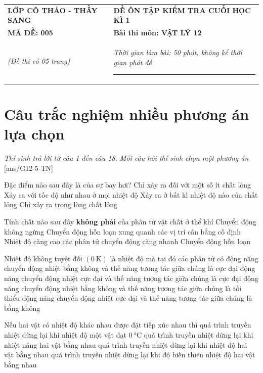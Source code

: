 \begin{tabular}{M{6.5cm}M{11cm}}
	\textbf{LỚP CÔ THẢO - THẦY SANG}& \textbf{ĐỀ ÔN TẬP KIỂM TRA CUỐI HỌC KÌ 1}\\
	\textbf{MÃ ĐỀ: 005}& \textbf{Bài thi môn: VẬT LÝ 12}\\
	\textit{(Đề thi có 05 trang)}& \textit{Thời gian làm bài: 50 phút, không kể thời gian phát đề}
	
	\noindent\rule{4cm}{0.8pt} \\
\end{tabular}
\setcounter{section}{0}
\section{Câu trắc nghiệm nhiều phương án lựa chọn}
\textit{Thí sinh trả lời từ câu 1 đến câu 18. Mỗi câu hỏi thí sinh chọn một phương án}
\setcounter{ex}{0}
[ans/G12-5-TN]
\begin{ex}
Đặc điểm nào sau đây là của sự bay hơi?	
	\choice
	{Chỉ xảy ra đối với một số ít chất lỏng}
	{Xảy ra với tốc độ như nhau ở mọi nhiệt độ}
	{\True Xảy ra ở bất kì nhiệt độ nào của chất lỏng}
	{Chỉ xảy ra trong lòng chất lỏng}
	\loigiai{}
\end{ex}
\begin{ex}
	Tính chất nào sau đây \textbf{không phải} của phân tử vật chất ở thể khí
	\choice
	{Chuyển động không ngừng}
	{\True Chuyển động hỗn loạn xung quanh các vị trí cân bằng cố định}
	{Nhiệt độ càng cao các phân tử chuyển động càng nhanh}
	{Chuyển động hỗn loạn}
	\loigiai{}
\end{ex}
\begin{ex}
Nhiệt độ không tuyệt đối $\left(\SI{0}{\kelvin}\right)$ là nhiệt độ mà tại đó các phân tử có	
	\choice
	{động năng chuyển động nhiệt bằng không và thế năng tương tác giữa chúng là cực đại}
	{động năng chuyển động nhiệt cực đại và thế năng tương tác giữa chúng là cực đại}
	{\True động năng chuyển động nhiệt bằng không và thế năng tương tác giữa chúng là tối thiểu}
	{động năng chuyển động nhiệt cực đại và thế năng tương tác giữa chúng là bằng không}
	\loigiai{}
\end{ex}
\begin{ex}
	Nếu hai vật có nhiệt độ khác nhau được đặt tiếp xúc nhau thì
	\choice
	{quá trình truyền nhiệt dừng lại khi nhiệt độ một vật đạt $\SI{0}{\celsius}$}
	{quá trình truyền nhiệt dừng lại khi nhiệt năng hai vật bằng nhau}
	{\True quá trình truyền nhiệt dừng lại khi nhiệt độ hai vật bằng nhau}
	{quá trình truyền nhiệt dừng lại khi độ biến thiên nhiệt độ hai vật bằng nhau}
	\loigiai{}
\end{ex}
